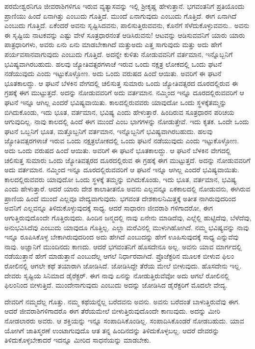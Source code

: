 ಪರಮೇಶ್ವರನಿಗೂ ಜೀವರಾಶಿಗಳಿಗೂ ಇರುವ ವ್ಯತ್ಯಾಸವನ್ನು ಇಲ್ಲಿ ಶ‍್ರೀಕೃಷ್ಣ ಹೇಳುತ್ತಾನೆ. ಭಗವಂತನಿಗೆ ಪ್ರತಿಯೊಂದು ಪ್ರಾಣಿಯು ಹಿಂದೆ ಏನಾಗಿತ್ತು ಎಂಬುದು ಗೊತ್ತಿದೆ. ಮುಂದೆ ಏನಾಗುವುದು ಎಂಬುದು ಗೊತ್ತಿದೆ. ಈಗ ಏನಾಗಿದೆ ಎಂಬುದು ಗೊತ್ತಿದೆ. ಏಕೆಂದರೆ ಅವನು ಸೃಷ್ಟಿಸಿದವನು, ಪಾಲಿಸುತ್ತಿರುವವನು, ಕೊನೆಗೆ ಸೆಳೆದುಕೊಳ್ಳುವವನು.. ಅವನು ಈ ಸೃಷ್ಟಿಯ ನಾಟಕವನ್ನು ಎಷ್ಟು ವೇಳೆ ಸೂತ್ರಧಾರನಂತೆ ಆಡಿಸಿರುವನು! ಆಟವನ್ನು ಆಡಿಸುವವನಿಗೆ ಯಾರು ಯಾರು ಪಾತ್ರಧಾರಿಗಳು, ಅವರು ಏನು ಏನು ಮಾಡಬೇಕಾಗಿದೆ ಮತ್ತುಅದು ಎತ್ತ ಸಾಗುವುದು ಮತ್ತು ಅದು ಹೇಗೆ ಪರ್ಯವಸಾನವಾಗುವುದು ಎಂಬುದು ಗೊತ್ತಿದೆ. ಅದನ್ನೇ ಕುಳಿತು ನೋಡುವವನಿಗೆ ವರ್ತಮಾನ, ಇನ್ನೊಬ್ಬನಿಗೆ ಭವಿಷ್ಯವಾಗಿರಬಹುದು. ಹಲವು ಜ್ಯೋತಿವತ್ಸರಗಳಾಚೆ ಇರುವ ಒಂದು ನಕ್ಷತ್ರ ಲೋಕದಲ್ಲಿ ಒಂದು ಘಟನೆ ನಡೆಯುವುದು ಎಂದು ಇಟ್ಟುಕೊಳ್ಳೋಣ. ಅದು ಒಂದು ವರುಷದ ಹಿಂದೆ ಆಯಿತು. ಅವರಿಗೆ ಈ ಘಟನೆ ಭೂತಕಾಲದ್ದು. ಆ ಘಟನೆ ಬೆಳಕಿನ ವೇಗದಲ್ಲಿ ಚಲಿಸುತ್ತ ಸುಮಾರು ಒಂದು ಜ್ಯೋತಿವತ್ಸರದ ದೂರದಲ್ಲಿರುವ ಈ ಗ್ರಹಕ್ಕೆ ಈಗ ಮುಟ್ಟುತ್ತದೆ. ಅದನ್ನು ನೋಡುವವರಿಗೆ ಅದು ವರ್ತಮಾನ. ನಮ್ಮಿಂದ ಇನ್ನೂ ದೂರದಲ್ಲಿರುವವರಿಗೆ ಆ ಘಟನೆ ಇನ್ನೂ ಆಗಿಲ್ಲ ಎಂದರೆ ಭವಿಷ್ಯವಾಯಿತು. ಕಾಲದಲ್ಲಿರುವವರು ಯಾವುದೋ ಒಂದು ಸ್ಥಳಕ್ಕೆತಮ್ಮನ್ನು ಬಿಗಿದುಕೊಂಡು, ಇದು ಭೂತ, ವರ್ತಮಾನ, ಭವಿಷ್ಯ ಎಂದು ಹೇಳುತ್ತಾರೆ. ಹಿಂದಿರುವ ಸೂತ್ರಧಾರನ ಪರಿಚಯ ಆಗುವುದಿಲ್ಲ. ನಾವು ಕಾಲದಲ್ಲಿ ಹಿಂದೆ ಈಗ ಮುಂದೆ ಎಂಬ ಭಾಗಗಳನ್ನು ನೋಡುತ್ತೇವೆ. ಇದು ಕೃತಕ. ಒಂದೇ ಒಂದು ಘಟನೆ ಒಬ್ಬನಿಗೆ ಭೂತ, ಮತ್ತೊಬ್ಬನಿಗೆ ವರ್ತಮಾನ, ಇನ್ನೊಬ್ಬನಿಗೆ ಭವಿಷ್ಯವಾಗಿರಬಹುದು. ಹಲವು ಜ್ಯೋತಿವತ್ಸರಗಳಾಚೆ ಇರುವ ಒಂದು ನಕ್ಷತ್ರಲೋಕದಲ್ಲಿ ಒಂದು ಘಟನೆ ನಡೆಯುವುದು ಎಂದು ಇಟ್ಟುಕೊಳ್ಳೋಣ. ಅದು ಒಂದು ವರುಷದ ಹಿಂದೆ ಆಯಿತು. ಅವರಿಗೆ ಈ ಘಟನೆ ಭೂತಕಾಲದ್ದು. ಆ ಘಟನೆ ಬೆಳಕಿನ ವೇಗದಲ್ಲಿ ಚಲಿಸುತ್ತ ಸುಮಾರು ಒಂದು ಜ್ಯೋತಿವತ್ಸರದ ದೂರದಲ್ಲಿರುವ ಈ ಗ್ರಹಕ್ಕೆ ಈಗ ಮುಟ್ಟುತ್ತದೆ. ಅದನ್ನು ನೋಡುವವರಿಗೆ ಅದು ವರ್ತಮಾನ. ನಮ್ಮಿಂದ ಇನ್ನೂ ದೂರದಲ್ಲಿರುವವರಿಗೆ ಆ ಘಟನೆ ಇನ್ನೂ ಆಗಿಲ್ಲ ಎಂದರೆ ಭವಿಷ್ಯವಾಯಿತು. ಕಾಲದಲ್ಲಿರುವವರು ಯಾವುದೋ ಒಂದು ಸ್ಥಳಕ್ಕೆ ತಮ್ಮನ್ನು ಬಿಗಿದುಕೊಂಡು, ಇದು ಭೂತ, ವರ್ತಮಾನ, ಭವಿಷ್ಯ ಎಂದು ಹೇಳುತ್ತಾರೆ. ಆದರೆ ಯಾರು ದೇಶ ಕಾಲಾತೀತನೊ ಅವನು ಎಲ್ಲವನ್ನೂ ಏಕಕಾಲದಲ್ಲಿ ನೋಡುವನು, ಈಗಿರುವ ಪ್ರಾಣಿಯ ಹಿಂದೆ ಮುಂದೆ ಎಲ್ಲವೂ ವೇದ್ಯವಾಗುವುದು. ಭಗವಂತ ದೇಶಕಾಲನಿಮಿತ್ತಕ್ಕೆ ಅತೀತ ನಾಗಿರುವುದರಿಂದ ಅವನಿಗೆ ಎಲ್ಲವನ್ನೂ ತಿಳಿದುಕೊಳ್ಳುವುದಕ್ಕೆ ಸಾಧ್ಯ. ಆದರೆ ಸಾಧಾರಣ ಜೀವರಾಶಿ ಗಳಿಗಾದರೋ, ಈಗ ಆಗುತ್ತಿರುವುದೊಂದೇ ಗೊತ್ತಿರುವುದು. ಹಿಂದಿನ ಜನ್ಮದಲ್ಲಿ ನಾವು ಏನೇನು ಮಾಡಿದೆವು, ಎಲ್ಲೆಲ್ಲಿ ಹುಟ್ಟಿದೆವು, ಬೆಳೆದೆವು, ಅನುಭವಿಸಿದೆವು ಎಂಬುದು ಯಾವುದೂ ಗೊತ್ತಿಲ್ಲ. ಎಲ್ಲಾ ಮರೆವಿನಲ್ಲಿ ಮುಳುಗಿಹೋಗಿದೆ. ನಮ್ಮ ಭವಿಷ್ಯವನ್ನು ನಾವು ಇನ್ನೂ ರೂಪಿಸಿಕೊಳ್ಳ ಬೇಕಾಗಿರುವುದರಿಂದ ಅದು ಹೇಗಿದೆ ಎಂಬುದನ್ನು ಹೇಗೆ ಊಹಿಸುವುದಕ್ಕೆ ಸಾಧ್ಯ ಎನ್ನುವೆವು ನಾವು. ಅಜ್ಞಾನಿಗೆ ಮುಂದಿನದು ಕಾಣದು. ಆದರೆ ಭಗವಂತನಿಗೆ ಹೊಸದೇನೂ ಅಲ್ಲ. ಅವನು ಯಾವ ಮಾರ್ಗದಲ್ಲಿ ನಡೆಯುತ್ತಾನೆ ಹೇಗೆ ಮಾಡುತ್ತಾನೆ ಎಂಬುದೆಲ್ಲ ಆಗಲೆ ನಿರ್ಧಾರವಾಗಿದೆ. ಪ್ರೊಜೆಕ್ಟರಿನ ಮೂಲಕ ಬೀಳುವ ಫಿಲಂ ರೋಲಿನಲ್ಲಿ ಆಗಲೇ ಕಥೆ ತಯಾರಾಗಿ ಜೋಡಿಸಿದೆ. ಜೋಡಿಸಿದ್ದೇ ತೆರೆಯ ಮೇಲೆ ಬೀಳುವುದು. ಹೊಸದೇನು ಇಲ್ಲ. ದೇವರು ಸೃಷ್ಟಿಯ ಸಿನಿಮಾದ ಡೈರೆಕ್ಟರ್. ಈಗ ನಾವು ಏನನ್ನು ನೋಡುತ್ತಿರುವೆವೋ ಅದು ಆಗಲೆ ರೋಲಿನಲ್ಲಿ ಫಿಲಂನಿಂದ ಬೀಳುತ್ತಿದೆ. ಮುಂದೇನಾಗುವುದು ಎಂಬುದು ಅದನ್ನು ಜೋಡಿಸಿದ ಡೈರೆಕ್ಟರಿಗೆ ಮೊದಲೇ ವೇದ್ಯ.

ದೇವರಿಗೆ ನಮ್ಮದೆಲ್ಲ ಗೊತ್ತು. ನಮ್ಮ ಕಥೆಯನ್ನೆಲ್ಲ ಬರೆದವನು ಅವನು. ಅವನು ಬರೆದಂತೆ ಬಾಳುತ್ತಿರುವೆವು ಈಗ. ಆದರೆ ಜೀವರಾಶಿಗಳಿಗಾದರೊ ಈಗ ತೆರೆಯಮೇಲೆ ಬೀಳುತ್ತಿರುವುದೊಂದೇ ಕಾಣುವುದು. ಅದನ್ನು ಮೀರಿ ನೋಡಲಾರರು ಅವರು. ಆ ಶಕ್ತಿಯನ್ನು ಇನ್ನೂ ಸಂಪಾದಿಸಿಕೊಂಡಿಲ್ಲ. ಸಂಪಾದಿಸಿಕೊಂಡರೆ ನೋಡಬಹುದು. ಯಾವ ಯೋಗಿಗೆ ಜಾತಿಸ್ಮರಣೆ ಉಂಟಾಗುವುದೊ ಆತ ತನ್ನ ಹಿಂದಿನದನ್ನು ತಿಳಿದುಕೊಳ್ಳಬಲ್ಲ. ಆದರೆ ದೇವರನ್ನು ತಿಳಿದುಕೊಳ್ಳಬೇಕಾದರೆ ಇದನ್ನೂ ಮೀರಿದ ಸಾಧನೆಯನ್ನು ಮಾಡಬೇಕು.

